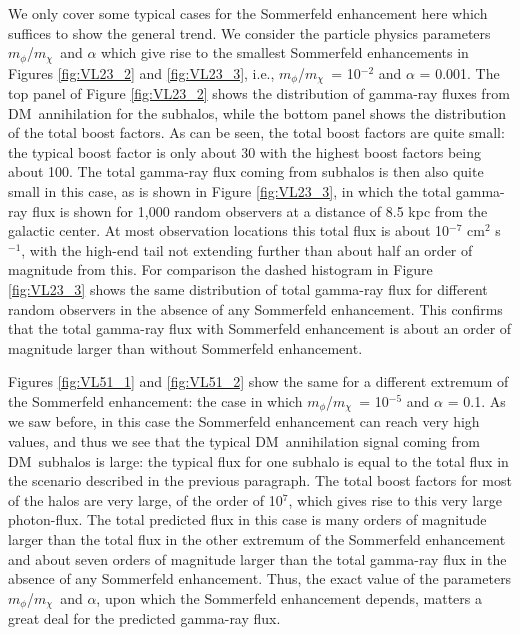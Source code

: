 \documentclass[aps,prd,twocolumn,amsmath,amssymb,floatfix,nofootinbib,10pt]{revtex4}
\newcommand{\ie}{i.e.}
\newcommand{\DM}{DM}
\newcommand{\mdm}{\ensuremath{m_{\chi}}}
\newcommand{\mv}{\ensuremath{m_{\phi}}}
\begin{document}
We only cover some typical cases for the Sommerfeld enhancement here
which suffices to show the general trend. We consider the particle
physics parameters \mv/\mdm\ and $\alpha$ which give rise to the
smallest Sommerfeld enhancements in Figures \ref{fig:VL23_2} and
\ref{fig:VL23_3}, \ie, \mv/\mdm\ = 10$^{-2}$ and $\alpha$ = 0.001. The
top panel of Figure \ref{fig:VL23_2} shows the distribution of
gamma-ray fluxes from \DM\ annihilation for the subhalos, while the
bottom panel shows the distribution of the total boost factors. As can
be seen, the total boost factors are quite small: the typical boost
factor is only about 30 with the highest boost factors being about
100. The total gamma-ray flux coming from subhalos is then also quite
small in this case, as is shown in Figure \ref{fig:VL23_3}, in which
the total gamma-ray flux is shown for 1,000 random observers at a
distance of 8.5 kpc from the galactic center. At most observation
locations this total flux is about 10$^{-7}$ cm$^2$ s$^{-1}$, with the
high-end tail not extending further than about half an order of
magnitude from this. For comparison the dashed histogram in Figure
\ref{fig:VL23_3} shows the same distribution of total gamma-ray flux
for different random observers in the absence of any Sommerfeld
enhancement. This confirms that the total gamma-ray flux with
Sommerfeld enhancement is about an order of magnitude larger than
without Sommerfeld enhancement. 

Figures \ref{fig:VL51_1} and \ref{fig:VL51_2} show the same for a
different extremum of the Sommerfeld enhancement: the case in which
\mv/\mdm\ = 10$^{-5}$ and $\alpha$ = 0.1. As we saw before, in this
case the Sommerfeld enhancement can reach very high values, and thus
we see that the typical \DM\ annihilation signal coming from \DM\
subhalos is large: the typical flux for one subhalo is equal to the
total flux in the scenario described in the previous paragraph. The
total boost factors for most of the halos are very large, of the order
of 10$^7$, which gives rise to this very large photon-flux. The total
predicted flux in this case is many orders of magnitude larger than
the total flux in the other extremum of the Sommerfeld enhancement and
about seven orders of magnitude larger than the total gamma-ray flux
in the absence of any Sommerfeld enhancement. Thus, the exact value of
the parameters \mv/\mdm\ and $\alpha$, upon which the Sommerfeld
enhancement depends, matters a great deal for the predicted gamma-ray
flux.
\end{document}
